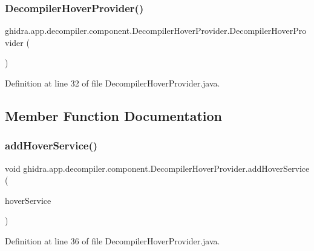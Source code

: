 \subsubsection{\texorpdfstring{DecompilerHoverProvider()}{DecompilerHoverProvider()}}
{\footnotesize\ttfamily ghidra.\+app.\+decompiler.\+component.\+Decompiler\+Hover\+Provider.\+Decompiler\+Hover\+Provider (\begin{DoxyParamCaption}{ }\end{DoxyParamCaption})\hspace{0.3cm}{\ttfamily [inline]}}



Definition at line 32 of file Decompiler\+Hover\+Provider.\+java.



\subsection{Member Function Documentation}
\mbox{\label{classghidra_1_1app_1_1decompiler_1_1component_1_1_decompiler_hover_provider_ae6dca6081c1cbae2e5e08ff06aa4d7d9}} 
\subsubsection{\texorpdfstring{addHoverService()}{addHoverService()}}
{\footnotesize\ttfamily void ghidra.\+app.\+decompiler.\+component.\+Decompiler\+Hover\+Provider.\+add\+Hover\+Service (\begin{DoxyParamCaption}\item[{\mbox{\hyperlink{interfaceghidra_1_1app_1_1decompiler_1_1component_1_1hover_1_1_decompiler_hover_service}{Decompiler\+Hover\+Service}}}]{hover\+Service }\end{DoxyParamCaption})\hspace{0.3cm}{\ttfamily [inline]}}



Definition at line 36 of file Decompiler\+Hover\+Provider.\+java.

